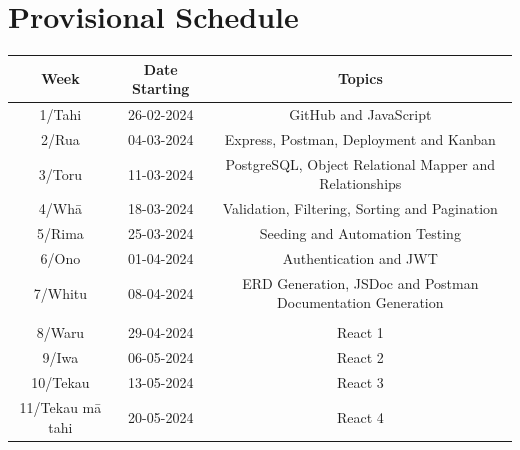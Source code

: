 \documentclass{article}
\begin{document}
\section*{Provisional Schedule}
\renewcommand{\arraystretch}{1.5}
\begin{tabular}{|c|c|c|c|}
	\hline
	\textbf{Week}                  & \textbf{Date Starting}            & \multicolumn{2}{c|}{\textbf{Topics}}                                                                                             \\ \hline
	1/Tahi           & 26-02-2024 & \multicolumn{2}{c|}{GitHub and JavaScript}    \\ \hline
	2/Rua            & 04-03-2024 & \multicolumn{2}{c|}{Express, Postman, Deployment and Kanban}                   \\ \hline
	3/Toru           & 11-03-2024 & \multicolumn{2}{c|}{PostgreSQL, Object Relational Mapper and Relationships} \\ \hline
	4/Whā            & 18-03-2024 & \multicolumn{2}{c|}{Validation, Filtering, Sorting and Pagination}                               \\ \hline
	5/Rima           & 25-03-2024 & \multicolumn{2}{c|}{Seeding and Automation Testing}                                                \\ \hline
	6/Ono            & 01-04-2024  & \multicolumn{2}{c|}{Authentication and JWT}                                                   \\ \hline
	7/Whitu          & 08-04-2024 &  \multicolumn{2}{c|}{ERD Generation, JSDoc and Postman Documentation Generation}                            \\ \hline
	\rowcolor{yellow} \multicolumn{4}{|c|}{Mid Term Break}                                                                                                                         \\ \hline
	8/Waru   & 29-04-2024 & \multicolumn{2}{c|}{React 1}                                                   \\ \hline
	9/Iwa            & 06-05-2024 & \multicolumn{2}{c|}{React 2}                                                                 \\ \hline
	10/Tekau         & 13-05-2024 & \multicolumn{2}{c|}{React 3}                                                                 \\ \hline
	11/Tekau mā tahi & 20-05-2024 & \multicolumn{2}{c|}{React 4}                                                                 \\ \hline

\end{tabular}
\end{document}
